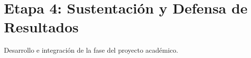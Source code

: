 \section{Etapa 4: Sustentación y Defensa de Resultados}
Desarrollo e integración de la fase del proyecto académico.
